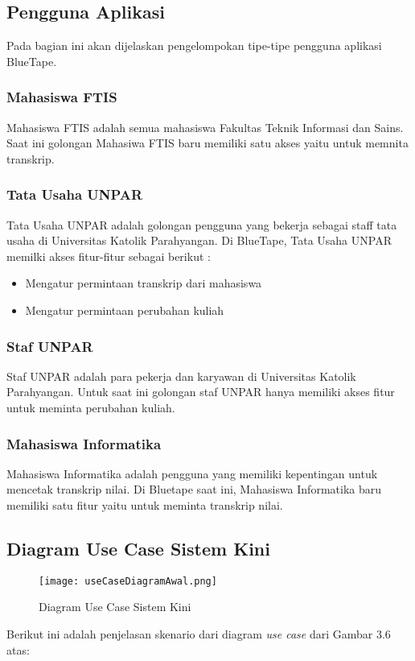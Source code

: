 \subsection{Pengguna Aplikasi}
Pada bagian ini akan dijelaskan pengelompokan tipe-tipe pengguna aplikasi BlueTape.

\subsubsection{Mahasiswa FTIS}
Mahasiswa FTIS adalah semua mahasiswa Fakultas Teknik Informasi dan Sains. Saat ini golongan Mahasiwa FTIS baru memiliki satu akses yaitu untuk memnita transkrip.


\subsubsection{Tata Usaha UNPAR}
Tata Usaha UNPAR adalah golongan pengguna yang bekerja sebagai staff tata usaha di Universitas Katolik Parahyangan. Di BlueTape, Tata Usaha UNPAR memilki akses fitur-fitur sebagai berikut :
\begin{itemize}
	\item Mengatur permintaan transkrip dari mahasiswa
	\item Mengatur permintaan perubahan kuliah 
\end{itemize}

\subsubsection{Staf UNPAR}
Staf UNPAR adalah para pekerja dan karyawan di Universitas Katolik Parahyangan. Untuk saat ini golongan staf UNPAR hanya memiliki akses fitur untuk meminta perubahan kuliah.

\subsubsection{Mahasiswa Informatika}
Mahasiswa Informatika adalah pengguna yang memiliki kepentingan untuk mencetak transkrip nilai. Di Bluetape saat ini, Mahasiswa Informatika baru memiliki satu fitur yaitu untuk meminta transkrip nilai.


\subsection{Diagram Use Case Sistem Kini}
\begin{figure} [H]
	\centering  
	\texttt{[image: useCaseDiagramAwal.png]}
	\caption[Diagram Use Case Sistem Kini]{Diagram Use Case Sistem Kini} 
	\label{fig:flow-chart-CodeIgniter} 
\end{figure}
Berikut ini adalah penjelasan skenario dari diagram \textit{use case} dari Gambar 3.6 atas:

